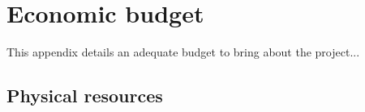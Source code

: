 \chapter{Economic budget} \label{chap:economic}

    This appendix details an adequate budget to bring about the project...
    
\section{Physical resources} \label{sec:physical_resources}

    